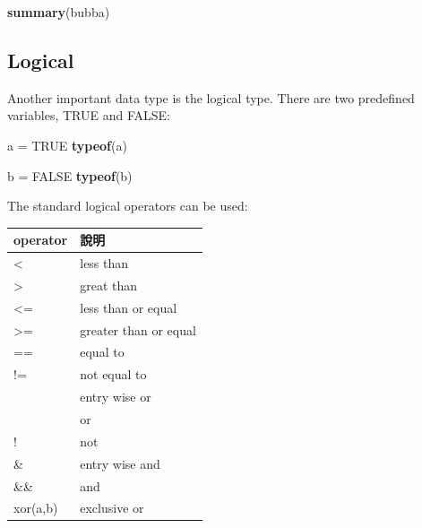 \documentclass[]{book}
\newenvironment{Shaded}{\begin{snugshade}}{\end{snugshade}}
\newcommand{\KeywordTok}[1]{\textcolor[rgb]{0.13,0.29,0.53}{\textbf{#1}}}
\newcommand{\StringTok}[1]{\textcolor[rgb]{0.31,0.60,0.02}{#1}}
\newcommand{\OtherTok}[1]{\textcolor[rgb]{0.56,0.35,0.01}{#1}}
\newcommand{\OperatorTok}[1]{\textcolor[rgb]{0.81,0.36,0.00}{\textbf{#1}}}
\newcommand{\NormalTok}[1]{#1}
\theoremstyle{definition}
\theoremstyle{definition}
\theoremstyle{definition}
\theoremstyle{remark}
\begin{document}
\begin{Shaded}
\begin{Highlighting}[]
\KeywordTok{summary}\NormalTok{(bubba)}
\end{Highlighting}
\end{Shaded}

\begin{Shaded}
\end{Shaded}

\begin{Shaded}
\end{Shaded}

\begin{Shaded}
\end{Shaded}

\subsection{Logical}\label{logical}

Another important data type is the logical type. There are two
predefined variables, TRUE and FALSE:

\begin{Shaded}
\begin{Highlighting}[]
\NormalTok{a =}\StringTok{ }\OtherTok{TRUE}
\KeywordTok{typeof}\NormalTok{(a)}
\end{Highlighting}
\end{Shaded}

\begin{Shaded}
\begin{Highlighting}[]
\NormalTok{b =}\StringTok{ }\OtherTok{FALSE}
\KeywordTok{typeof}\NormalTok{(b)}
\end{Highlighting}
\end{Shaded}

The standard logical operators can be used:

\begin{longtable}[]{@{}ll@{}}
\toprule
operator & 說明\tabularnewline
\midrule
\endhead
\textless{} & less than\tabularnewline
\textgreater{} & great than\tabularnewline
\textless{}= & less than or equal\tabularnewline
\textgreater{}= & greater than or equal\tabularnewline
== & equal to\tabularnewline
!= & not equal to\tabularnewline
\textbar{} & entry wise or\tabularnewline
\textbar{}\textbar{} & or\tabularnewline
! & not\tabularnewline
\& & entry wise and\tabularnewline
\&\& & and\tabularnewline
xor(a,b) & exclusive or\tabularnewline
\bottomrule
\end{longtable}
\end{document}
